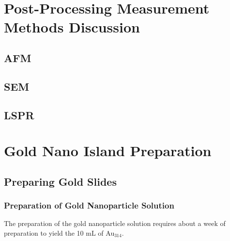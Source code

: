 \documentclass[12pt,oneside,english]{article}
\begin{document}
    \section{ Post-Processing Measurement Methods Discussion }
    \subsection{AFM}
    \subsection{SEM}
    \subsection{LSPR}



    \section{Gold Nano Island Preparation}    

    \subsection{Preparing Gold Slides}
    
    \subsubsection{Preparation of Gold Nanoparticle Solution}
    The preparation of the gold nanoparticle solution requires about a week of preparation to yield the 10 mL of Au$_{314}$.
    
\end{document}
